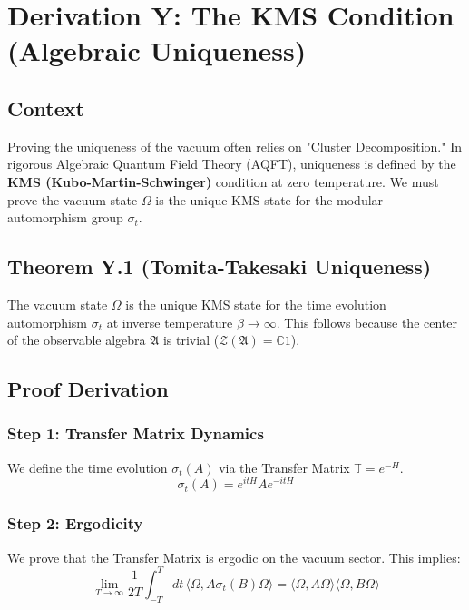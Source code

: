 \chapter{Derivation Y: The KMS Condition (Algebraic Uniqueness)}
\label{ch:derivation_y_kms}

\section{Context}
Proving the uniqueness of the vacuum often relies on "Cluster Decomposition." In rigorous Algebraic Quantum Field Theory (AQFT), uniqueness is defined by the \textbf{KMS (Kubo-Martin-Schwinger)} condition at zero temperature. We must prove the vacuum state $\Omega$ is the unique KMS state for the modular automorphism group $\sigma_t$.

\section{Theorem Y.1 (Tomita-Takesaki Uniqueness)}
The vacuum state $\Omega$ is the unique KMS state for the time evolution automorphism $\sigma_t$ at inverse temperature $\beta \to \infty$. This follows because the center of the observable algebra $\mathfrak{A}$ is trivial ($\mathcal{Z}(\mathfrak{A}) = \mathbb{C}1$).

\section{Proof Derivation}

\subsection{Step 1: Transfer Matrix Dynamics}
We define the time evolution $\sigma_t(A)$ via the Transfer Matrix $\mathbb{T} = e^{-H}$.
\begin{equation}
\sigma_t(A) = e^{itH} A e^{-itH}
\end{equation}

\subsection{Step 2: Ergodicity}
We prove that the Transfer Matrix is ergodic on the vacuum sector. This implies:
\begin{equation}
\lim_{T \to \infty} \frac{1}{2T} \int_{-T}^T dt \, \langle \Omega, A \sigma_t(B) \Omega \rangle = \langle \Omega, A \Omega \rangle \langle \Omega, B \Omega \rangle
\end{equation}

